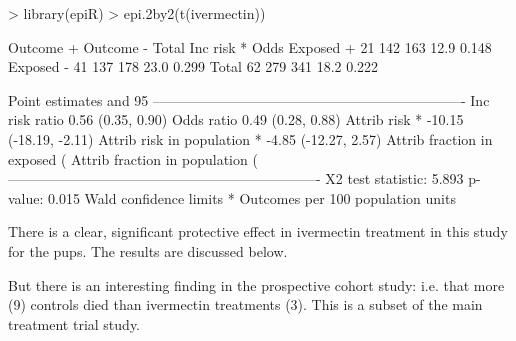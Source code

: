\documentclass{article}
\begin{document}
\begin{Schunk}
\begin{Sinput}
> library(epiR)
> epi.2by2(t(ivermectin))
\end{Sinput}
\begin{Soutput}
             Outcome +    Outcome -      Total        Inc risk *        Odds
Exposed +           21          142        163              12.9       0.148
Exposed -           41          137        178              23.0       0.299
Total               62          279        341              18.2       0.222

Point estimates and 95 %
-------------------------------------------------------------------
Inc risk ratio                               0.56 (0.35, 0.90)
Odds ratio                                   0.49 (0.28, 0.88)
Attrib risk *                                -10.15 (-18.19, -2.11)
Attrib risk in population *                  -4.85 (-12.27, 2.57)
Attrib fraction in exposed (%
Attrib fraction in population (%
-------------------------------------------------------------------
 X2 test statistic: 5.893 p-value: 0.015
 Wald confidence limits
 * Outcomes per 100 population units 
\end{Soutput}
\end{Schunk}

There is a clear, significant protective effect in ivermectin treatment in this study for the pups. The results are discussed below. 

But there is an interesting finding in the prospective cohort study: i.e. that more (9) controls died than ivermectin treatments (3). This is a subset of the main treatment trial study.
\end{document}
